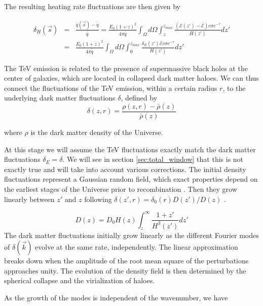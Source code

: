 \documentclass[twocolumns]{emulateapj}
\begin{document}
The resulting heating rate fluctuations are then given by

\begin{eqnarray}
  \label{eq:heat_fluc_exp0}
  \delta_H(\vec{s})&=&\frac{\dot{q}(\vec{s})-\bar{\dot{q}}}{\bar{\dot{q}}}=\frac{E_0(1+z)^2}{4\pi\bar{\dot{q}}} \int_{\Omega}d\Omega\int_z^{z_{max}} \frac{ ( \mathcal{E}(z')-\bar{\mathcal{E}})c\sigma  e^{-\tau}}{H(z')} dz' \\ \nonumber
  &=&\frac{E_0(1+z)^2}{4\pi\bar{\dot{q}}}  \int_{\Omega}d\Omega\int_0^{z_{max}}   \frac{\delta_E(z')\bar{\mathcal{E}} c\sigma  e^{-\tau}}{H(z')}dz'
\end{eqnarray}

The TeV emission is related to the presence of supermassive black holes at the center of galaxies, which are located in collapsed dark matter haloes.  We can thus connect the fluctuations of the TeV emission, within a certain radius $r$, to the underlying dark matter fluctuations $\delta$, defined by
\begin{equation}
  \label{eq:delta}
  \delta(z,r)=\frac{\rho(z,r)-\bar{\rho}(z)}{\bar{\rho}(z)}
\end{equation}

where $\rho$ is the dark matter  density of the Universe. 

At this stage we will assume the TeV fluctuations exactly match the dark matter fluctuations $\delta_E=\delta$.  We will see in section \ref{sec:total_window} that this is not exactly true and will take into account various corrections.  The initial density fluctuations represent a Gaussian random field, which exact properties depend on the earliest stages of the Universe prior to recombination \citep{1986ApJ...304...15B,Peebles}. Then they grow linearly between $z'$ and $z$ following $\delta(z',r)=\delta_0(r)D(z')/D(z)$ \citep{ 1977MNRAS.179..351H}.

\begin{equation}
  \label{eq:growth_1}
  D(z)=D_0H(z)\int_z^{\infty}\frac{1+z'}{H^3(z')}dz'
\end{equation}
The dark matter fluctuations initially grow linearly as the different Fourier modes of $\delta(\vec{k})$ evolve at the same rate, independently. The linear approximation breaks down when the amplitude of the root mean square of the perturbations approaches unity. The evolution of the density field is then determined by the spherical collapse \citep{1972ApJ...176....1G} and the virialization of haloes.


As the growth of the modes is independent of the wavenumber, we have
\end{document}
